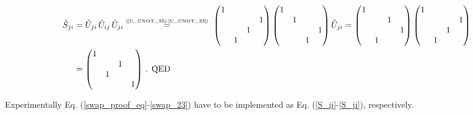\documentclass[11pt]{article}
\numberwithin{equation}{section} %
\numberwithin{figure}{section} %
\newcommand\numeq[1] %
  {\stackrel{\scriptscriptstyle(\mkern-1.5mu#1\mkern-1.5mu)}{=}}
\begin{document}
\begin{appendices}
\begin{equation} \label{swap_23}
\begin{split}
\hat{S}_{ji}
&	= \hat{U}_{ji}\,\hat{U}_{ij}\,\hat{U}_{ji}\numeq{\textrm{\ref{U_CNOT_32}-\ref{U_CNOT_23}}}\,\, \begin{pmatrix} 1&&&\\ &&&1\\ &&1&\\ &1&&\end{pmatrix}  \begin{pmatrix} 1&&&\\ &1&&\\ &&&1\\ &&1&\end{pmatrix} \hat{U}_{ji} =\begin{pmatrix}1&&&\\ &&1&\\ &&&1\\ &1&&\end{pmatrix} \begin{pmatrix} 1&&&\\ &&&1\\ &&1&\\ &1&&\end{pmatrix}\\
& = \begin{pmatrix}1&&&\\ &&1&\\ &1&&\\ &&&1\end{pmatrix}\,\textrm{. QED}
\end{split}
\end{equation}

Experimentally Eq. (\ref{swap_proof_eq}-\ref{swap_23}) have to be implemented as Eq. (\ref{S_ij}-\ref{S_ji}), respectively.





\vspace{1cm}
\subsection{} \label{U_I_gates}


\end{appendices}
\end{document}
